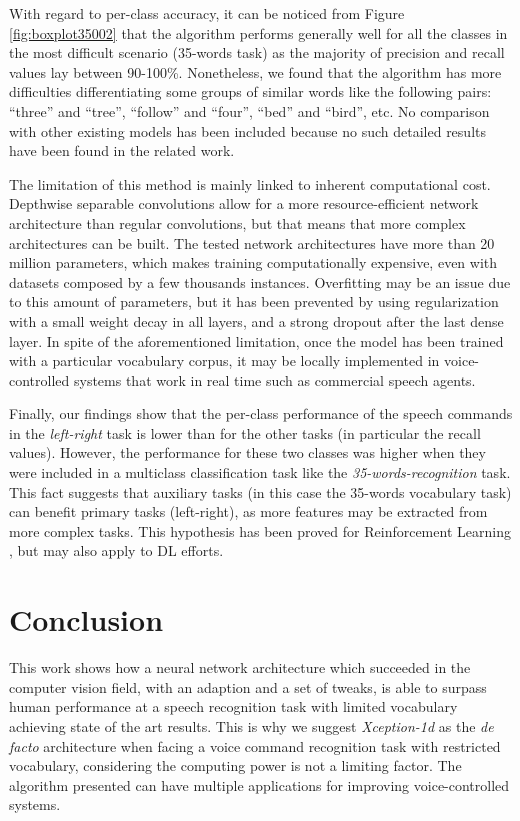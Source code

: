 \documentclass[review]{elsarticle}
\begin{document}
With regard to per-class accuracy, it can be noticed from Figure \ref{fig:boxplot35002} that the algorithm performs generally well for all the classes in the most difficult scenario (35-words task) as the majority of precision and recall values lay between 90-100\%. Nonetheless, we found that the algorithm has more difficulties differentiating some groups of similar words like the following pairs: ``three'' and ``tree'', ``follow'' and ``four'', ``bed'' and ``bird'', etc. No comparison with other existing models has been included because no such detailed results have been found in the related work.

The limitation of this method is mainly linked to inherent computational cost. Depthwise separable convolutions allow for a more resource-efficient network architecture than regular convolutions, but that means that more complex architectures can be built. The tested network architectures have more than 20 million parameters, which makes training computationally expensive, even with datasets composed by a few thousands instances. Overfitting may be an issue due to this amount of parameters, but it has been prevented by using regularization with a small weight decay in all layers, and a strong dropout after the last dense layer. In spite of the aforementioned limitation, once the model has been trained with a particular vocabulary corpus, it may be locally implemented in voice-controlled systems that work in real time such as commercial speech agents.
  
Finally, our findings show that the per-class performance of the speech commands in the \textit{left-right} task is lower than for the other tasks (in particular the recall values). However, the performance for these two classes was higher when they were included in a multiclass classification task like the \textit{35-words-recognition} task. This fact suggests that auxiliary tasks (in this case the 35-words vocabulary task) can benefit primary tasks (left-right), as more features may be extracted from more complex tasks. This hypothesis has been proved for Reinforcement Learning \cite{Jaderberg2016}, but may also apply to DL efforts.


\section{Conclusion} \label{sec:conclusion}
This work shows how a neural network architecture which succeeded in the computer vision field, with an adaption and a set of tweaks, is able to surpass human performance at a speech recognition task with limited vocabulary achieving state of the art results. This is why we suggest \textit{Xception-1d} as the \textit{de facto} architecture when facing a voice command recognition task with restricted vocabulary,  considering the computing power is not a limiting factor. The algorithm presented can have multiple  applications for improving voice-controlled systems. 
\end{document}
